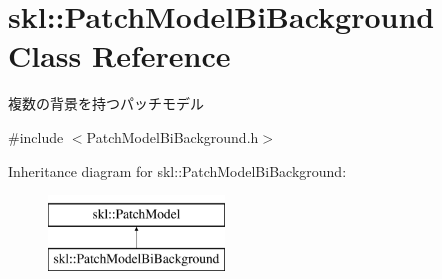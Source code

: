 \hypertarget{classskl_1_1_patch_model_bi_background}{}\section{skl\+:\+:Patch\+Model\+Bi\+Background Class Reference}
\label{classskl_1_1_patch_model_bi_background}


複数の背景を持つパッチモデル  




{\ttfamily \#include $<$Patch\+Model\+Bi\+Background.\+h$>$}

Inheritance diagram for skl\+:\+:Patch\+Model\+Bi\+Background\+:\begin{figure}[H]
\begin{center}
\leavevmode
\includegraphics[height=2.000000cm]{classskl_1_1_patch_model_bi_background}
\end{center}
\end{figure}

